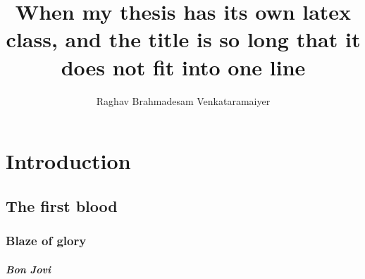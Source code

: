 \documentclass{iitkthesis}
\title{When my thesis has its own latex class, and the title is so
  long that it does not fit into one line}
\author{Raghav Brahmadesam Venkataramaiyer}
\begin{document}
\frontmatter
\maketitle
\certificate
\declaration

\abstract{\lipsum}

\mainmatter
\chapter{Introduction}

\lipsum[1-4]

\section{The first blood}
\lipsum[5-12]

\subsection{Blaze of glory}
\lipsum[14-28]

\paragraph{Bon Jovi}
\lipsum[29-31]
\end{document}
